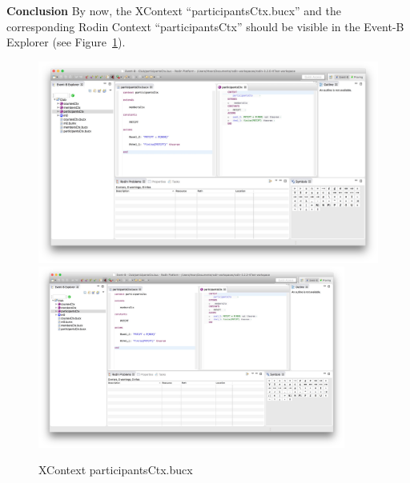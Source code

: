 \textbf{Conclusion} By now, the XContext ``participantsCtx.bucx'' and the corresponding Rodin Context ``participantsCtx'' should be visible in the Event-B Explorer (see Figure~\ref{fig:ParticipantsCtx}).
  \begin{figure}[!htbp]
    \centering
    \ifplastex
    \includegraphics[width=512]{figures/ParticipantsCtx}
    \else
    \includegraphics[width=0.9\textwidth]{figures/ParticipantsCtx}
    \fi
    \caption{XContext participantsCtx.bucx}
    \label{fig:ParticipantsCtx}
  \end{figure}

